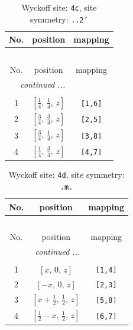 \documentclass[fleqn,8pt]{jsarticle}
\begin{document}
\begin{longtable}{ccc}
\caption{Wyckoff site: {\tt 4c}, site symmetry: {\tt ..2'}}
 \\
 \hline \hline
No. & position & mapping \\ \hline \endfirsthead

\multicolumn{2}{l}{\tablename\ \thetable{}} \\
 \hline \hline
No. & position & mapping \\ \hline \endhead

 \hline \hline
\multicolumn{2}{r}{\footnotesize\it continued ...} \\ \endfoot

 \hline \hline
\multicolumn{2}{r}{} \\ \endlastfoot

1 & $\left[ \frac{1}{4},\, \frac{1}{4},\, z \right]$ & {\tt [1,6]} \\ \hline
2 & $\left[ \frac{3}{4},\, \frac{3}{4},\, z \right]$ & {\tt [2,5]} \\ \hline
3 & $\left[ \frac{3}{4},\, \frac{1}{4},\, z \right]$ & {\tt [3,8]} \\ \hline
4 & $\left[ \frac{1}{4},\, \frac{3}{4},\, z \right]$ & {\tt [4,7]} \\
\end{longtable}
\renewcommand{\arraystretch}{1.2}
\begin{longtable}{ccc}
\caption{Wyckoff site: {\tt 4d}, site symmetry: {\tt .m.}}
 \\
 \hline \hline
No. & position & mapping \\ \hline \endfirsthead

\multicolumn{2}{l}{\tablename\ \thetable{}} \\
 \hline \hline
No. & position & mapping \\ \hline \endhead

 \hline \hline
\multicolumn{2}{r}{\footnotesize\it continued ...} \\ \endfoot

 \hline \hline
\multicolumn{2}{r}{} \\ \endlastfoot

1 & $\left[ x,\, 0,\, z \right]$ & {\tt [1,4]} \\ \hline
2 & $\left[ - x,\, 0,\, z \right]$ & {\tt [2,3]} \\ \hline
3 & $\left[ x + \frac{1}{2},\, \frac{1}{2},\, z \right]$ & {\tt [5,8]} \\ \hline
4 & $\left[ \frac{1}{2} - x,\, \frac{1}{2},\, z \right]$ & {\tt [6,7]} \\
\end{longtable}
\end{document}
